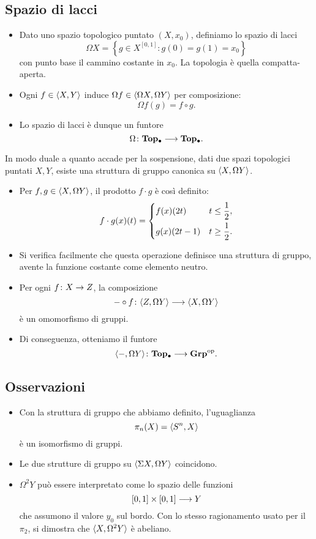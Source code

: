 \subsection*{Spazio di lacci}
\begin{frame*}
\begin{itemize}
\item Dato uno spazio topologico puntato $(X,x_0)$, definiamo lo spazio di lacci
\[
\Omega X=\left\{g\in X^{[0,1]}:g(0)=g(1)=x_0\right\}
\]
con punto base il cammino costante in $x_0$. La topologia è quella compatta-aperta.
\item Ogni $f\in\langle X,Y\rangle$ induce $\Omega f\in\langle \Omega X,\Omega Y\rangle$ per composizione:
\[
\Omega f(g)=f\circ g.
\]
 \item Lo spazio di lacci è dunque un funtore
\[
\map{\Omega}{\Top0}{\Top0}.
\]
\end{itemize}
\end{frame*}

\begin{frame*}
In modo duale a quanto accade per la sospensione, dati due spazi topologici puntati $X,Y$, esiste una struttura di gruppo canonica su $\langle X,\Omega Y\rangle$.
\begin{itemize}
\item Per $f,g\in\langle X,\Omega Y\rangle$, il prodotto $f\cdot g$ è così definito:
\[
f\cdot g(x)(t)=\begin{dcases}f(x)(2t)&t\le\frac{1}{2},\\g(x)(2t-1)&t\ge\frac{1}{2}.\end{dcases}
\]
\item Si verifica facilmente che questa operazione definisce una struttura di gruppo, avente la funzione costante come elemento neutro.
\item Per ogni $\map{f}{X}{Z}$, la composizione
\[
\map{-\circ f}{\hmaps{Z,\Omega Y}}{\hmaps{X,\Omega Y}}
\]
 è un omomorfismo di gruppi.
 \item Di conseguenza, otteniamo il funtore
 \[
 \map{\hmaps{-,\Omega Y}}{\Top0}{\Grp^{\text{op}}}.
 \]
\end{itemize}
\end{frame*}

\subsection*{Osservazioni}
\begin{frame*}
\begin{itemize}
\item Con la struttura di gruppo che abbiamo definito, l'uguaglianza
\[
\pi_n(X)=\langle S^n,X\rangle
\]
è un isomorfismo di gruppi.
\item Le due strutture di gruppo su  $\langle \Sigma X,\Omega Y\rangle$ coincidono.
\item $\Omega^2Y$ può essere interpretato come lo spazio delle funzioni
\[
\umap{[0,1]\times[0,1]}{Y}
\]
che assumono il valore $y_0$ sul bordo. Con lo stesso ragionamento usato per il $\pi_2$, si dimostra che $\langle X,\Omega^2Y\rangle$ è abeliano.
\end{itemize}
\end{frame*}

